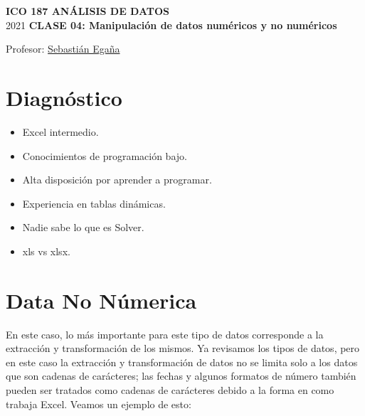 \documentclass[12 pt,letterpaper]{article}
\begin{document}
%

	
	\pagestyle{fancy}
	\fancyhf{}
	\renewcommand{\headrulewidth}{0pt}
	\renewcommand{\footrulewidth}{0pt}	
	
\begin{center}
		
	\bigbreak
	\textbf{ICO 187 ANÁLISIS DE DATOS}\\
	\small{2021}
	\break
	\textbf{CLASE 04: Manipulación de datos numéricos y no numéricos}\\
\end{center}

\begin{flushright}	
		
	Profesor: \href{mailto:sebastianeganasa@santotomas.cl}{Sebastián Egaña}

\end{flushright}

\section{Diagnóstico}

\begin{itemize}
	\item Excel intermedio.
	
	\item Conocimientos de programación bajo.
	
	\item Alta disposición por aprender a programar.
	
	\item Experiencia en tablas dinámicas.
	
	\item Nadie sabe lo que es Solver.
	
	\item xls vs xlsx.	
\end{itemize}

\section{Data No Númerica}

En este caso, lo más importante para este tipo de datos corresponde a la extracción y transformación de los mismos. Ya revisamos los tipos de datos, pero en este caso la extracción y transformación de datos no se limita solo a los datos que son cadenas de carácteres; las fechas y algunos formatos de número también pueden ser tratados como cadenas de carácteres debido a la forma en como trabaja Excel. Veamos un ejemplo de esto:\\
\end{document}
